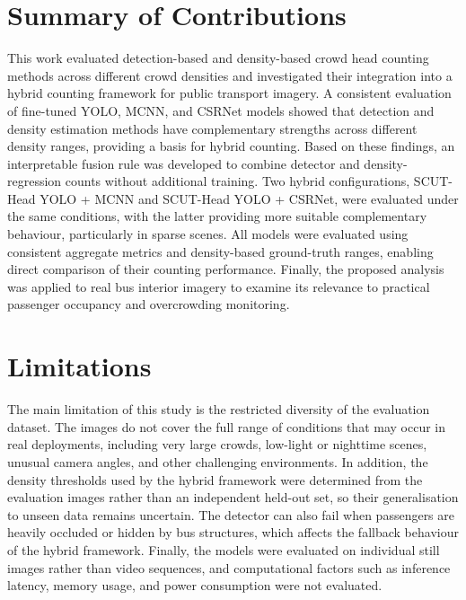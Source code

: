 \label{chap:conclusion}

\section{Summary of Contributions}
\label{sec:conclusion_contributions}

This work evaluated detection-based and density-based crowd head counting methods across different crowd densities and investigated their integration into a hybrid counting framework for public transport imagery. A consistent evaluation of fine-tuned YOLO, MCNN, and CSRNet models showed that detection and density estimation methods have complementary strengths across different density ranges, providing a basis for hybrid counting. Based on these findings, an interpretable fusion rule was developed to combine detector and density-regression counts without additional training. Two hybrid configurations, SCUT-Head YOLO + MCNN and SCUT-Head YOLO + CSRNet, were evaluated under the same conditions, with the latter providing more suitable complementary behaviour, particularly in sparse scenes. All models were evaluated using consistent aggregate metrics and density-based ground-truth ranges, enabling direct comparison of their counting performance. Finally, the proposed analysis was applied to real bus interior imagery to examine its relevance to practical passenger occupancy and overcrowding monitoring.

\section{Limitations}
\label{sec:conclusion_limitations}

The main limitation of this study is the restricted diversity of the evaluation dataset. The images do not cover the full range of conditions that may occur in real deployments, including very large crowds, low-light or nighttime scenes, unusual camera angles, and other challenging environments. In addition, the density thresholds used by the hybrid framework were determined from the evaluation images rather than an independent held-out set, so their generalisation to unseen data remains uncertain. The detector can also fail when passengers are heavily occluded or hidden by bus structures, which affects the fallback behaviour of the hybrid framework. Finally, the models were evaluated on individual still images rather than video sequences, and computational factors such as inference latency, memory usage, and power consumption were not evaluated.

